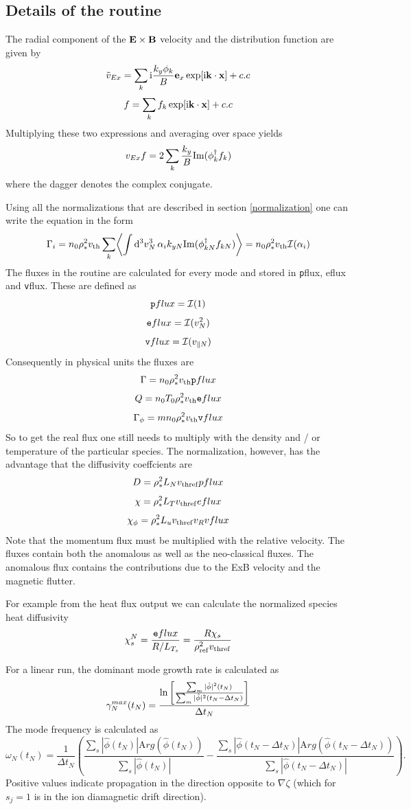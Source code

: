 \documentclass{report}
\def\be{\begin{equation}}
\def\ee{\end{equation}}
\begin{document}
\subsection{Details of the routine}
The radial component of the ${\bf E} \times {\bf B}$ velocity and the distribution function are given by 
\be 
\tilde {v}_{Ex} = \sum_k  {\rm i} {k_y \phi_k \over B} {\bf e}_x \exp [ {\rm i} {\bf k} 
\cdot {\bf x} ] + c.c  
\ee
\be 
f = \sum_k f_k\exp [ {\rm i} {\bf k} \cdot {\bf x} ] + c.c  
\ee
Multiplying these two expressions and averaging over space yields 
\be 
v_{Ex} f = 2 \sum_k {k_y \over B} {\rm Im} ( \phi_k^\dagger f_k) 
\ee 
where the dagger denotes the complex conjugate.  

Using all the normalizations that are described in section \ref{normalization} one can 
write the equation in the form 
\be 
\Gamma_i = n_0 \rho_*^2 v_{\rm th} \sum_k \biggl \langle \int {\rm d}^3 v_N^3 \, \alpha_i k_{yN} 
{\rm Im}(\phi^\dagger_{kN}  f_{kN} ) \biggr \rangle  =  n_0 \rho_*^2 v_{\rm th} {\cal I}(\alpha_i)
\ee 
The fluxes in the routine are calculated for every mode and stored in {\texttt pflux, eflux}
and {\texttt vflux}. These are defined as 
\be 
{\texttt pflux} = {\cal I}(1)
\ee
\be 
{\texttt eflux} = {\cal I}(v_N^2)
\ee
\be 
{\texttt vflux} = {\cal I}(v_{\parallel N} ) 
\ee
Consequently in physical units the fluxes are 
\be 
\Gamma = n_0 \rho_*^2 v_{\rm th} {\texttt pflux} 
\ee
\be 
Q = n_0 T_0 \rho_*^2 v_{\rm th} {\texttt eflux} 
\ee
\be 
\Gamma_\phi = m n_0 \rho_*^2 v_{\rm th} {\texttt vflux} 
\ee    
So to get the real flux one still needs to multiply with the density and / or temperature of the particular species.  The normalization, however, has the advantage that the diffusivity coeffcients are
\be
D       = \rho_*^2 L_N v_{\rm thref} pflux
\ee
\be
\chi     = \rho_*^2 L_T v_{\rm thref} eflux 
\ee
\be
\chi_{\phi} = \rho_*^2 L_u v_{\rm thref} v_R vflux
\ee
Note that the momentum flux must be multiplied with the relative velocity. The fluxes contain both the anomalous as well as the neo-classical fluxes. The anomalous flux contains the contributions due to the ExB velocity and the magnetic flutter.

For example from the heat flux output we can calculate the normalized species heat diffusivity
\be
\chi_s^N = {{\texttt eflux} \over R/L_{T_s} } = {R \chi_s  \over \rho_{\rm ref}^2 v_{\rm thref}} 
\ee

For a linear run, the dominant mode growth rate is calculated as
\be
\gamma_{N}^{max}(t_N)={\ln \left[{\sum_m |\hat \phi|^2(t_N) \over \sum_m |\hat \phi|^2(t_N-\Delta t_N)}\right] \over \Delta t_N}
\ee
The mode frequency is calculated as
\be
\omega_N(t_N)=\frac{1}{\Delta t_N}\left(\frac{\sum_s |\hat \phi(t_N)| {\mathrm Arg}({\hat \phi}(t_N))}{\sum_s|\hat \phi(t_N)|} - \frac{\sum_s |\hat \phi(t_N-\Delta t_N)|{\mathrm Arg}({\hat
\phi}(t_N-\Delta t_N))}{\sum_s |\hat \phi(t_N-\Delta t_N)|}\right).
\ee
Positive values indicate propagation in the direction opposite to $\nabla \zeta$ (which for $s_j=1$ is in the ion diamagnetic drift direction).
\end{document}

